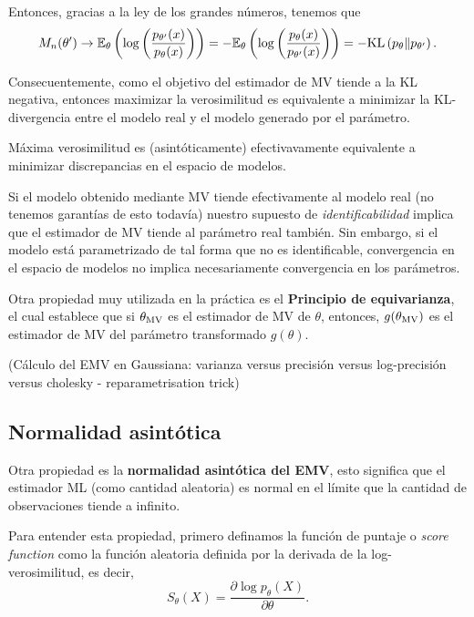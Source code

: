  Entonces, gracias a la ley de los grandes números, tenemos que 
 \begin{equation}
 	M_n(\theta') \rightarrow \mathbb{E}_\theta \left(\log\left(\frac{p_{\theta'}(x)}{p_{\theta}(x)}\right)\right) = -\mathbb{E}_\theta \left(\log\left(\frac{p_{\theta}(x)}{p_{\theta'}(x)}\right)\right) = -\text{KL}\left(p_\theta\middle\|p_{\theta'}\right).
 \end{equation}

 Consecuentemente, como el objetivo del estimador de MV tiende a la KL negativa, entonces maximizar la verosimilitud es equivalente a minimizar la KL-divergencia entre el modelo real y el modelo generado por el parámetro. 
\begin{remark}
 Máxima verosimilitud es (asintóticamente) efectivavamente equivalente a minimizar discrepancias en el espacio de modelos.
\end{remark}
 
\begin{remark}
 Si el modelo obtenido mediante MV tiende efectivamente al modelo real (no tenemos garantías de esto todavía) nuestro supuesto de \textit{identificabilidad} implica que el estimador de MV tiende al parámetro real también. Sin embargo, si el modelo está parametrizado de tal forma que no es identificable, convergencia en el espacio de modelos no implica necesariamente convergencia en los parámetros.   
\end{remark}
 
 


 Otra propiedad muy utilizada en la práctica es el \textbf{Principio de equivarianza}, el cual establece que si ${\theta_\text{MV}}$ es el estimador de MV de $\theta$, entonces, $g({\theta_\text{MV}})$ es el estimador de MV del parámetro transformado $g(\theta)$.

\begin{example}(Cálculo del EMV en Gaussiana: varianza versus precisión versus log-precisión versus cholesky - reparametrisation trick)
	
\end{example}

\subsection{Normalidad asintótica}

Otra propiedad es la \textbf{normalidad asintótica del EMV}, esto significa que el estimador ML (como cantidad aleatoria) es normal en el límite que la cantidad de  observaciones tiende a infinito. 

Para entender esta propiedad, primero definamos la función de puntaje o \textit{score function} como la {función aleatoria} definida por la derivada de la log-verosimilitud, es decir, 
\begin{equation}
	S_\theta(X) = \frac{\partial \log p_\theta(X)}{\partial\theta}.
\end{equation}

